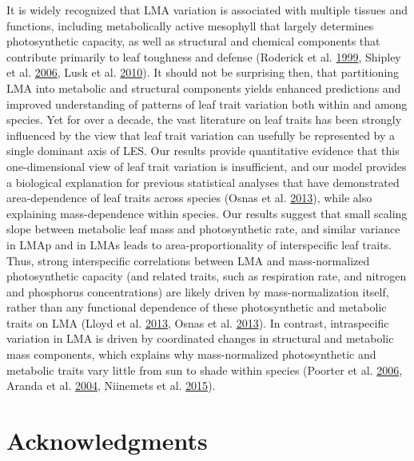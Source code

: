 \documentclass[
  12pt,
]{article}
\begin{document}
It is widely recognized that LMA variation is associated with multiple tissues and functions, including metabolically active mesophyll that largely determines photosynthetic capacity, as well as structural and chemical components that contribute primarily to leaf toughness and defense (Roderick et al. \protect\hyperlink{ref-Roderick1999}{1999}, Shipley et al. \protect\hyperlink{ref-Shipley2006}{2006}, Lusk et al. \protect\hyperlink{ref-Lusk2010}{2010}).
It should not be surprising then, that partitioning LMA into metabolic and structural components yields enhanced predictions and improved understanding of patterns of leaf trait variation both within and among species.
Yet for over a decade, the vast literature on leaf traits has been strongly influenced by the view that leaf trait variation can usefully be represented by a single dominant axis of LES.
Our results provide quantitative evidence that this one-dimensional view of leaf trait variation is insufficient, and our model provides a biological explanation for previous statistical analyses that have demonstrated area-dependence of leaf traits across species (Osnas et al. \protect\hyperlink{ref-Osnas2013}{2013}), while also explaining mass-dependence within species. Our results suggest that small scaling slope between metabolic leaf mass and photosynthetic rate, and similar variance in LMAp and in LMAs leads to area-proportionality of interspecific leaf traits.
Thus, strong interspecific correlations between LMA and mass-normalized photosynthetic capacity (and related traits, such as respiration rate, and nitrogen and phosphorus concentrations) are likely driven by mass-normalization itself, rather than any functional dependence of these photosynthetic and metabolic traits on LMA (Lloyd et al. \protect\hyperlink{ref-Lloyd2013}{2013}, Osnas et al. \protect\hyperlink{ref-Osnas2013}{2013}).
In contrast, intraspecific variation in LMA is driven by coordinated changes in structural and metabolic mass components, which explains why mass-normalized photosynthetic and metabolic traits vary little from sun to shade within species (Poorter et al. \protect\hyperlink{ref-Poorter2006b}{2006}, Aranda et al. \protect\hyperlink{ref-Aranda2004}{2004}, Niinemets et al. \protect\hyperlink{ref-Niinemets2015}{2015}).

\hypertarget{acknowledgments}{%
\section{Acknowledgments}\label{acknowledgments}}
\end{document}
